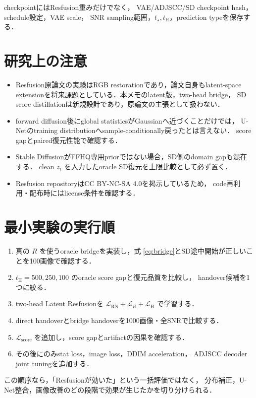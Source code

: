 \documentclass[11pt,a4paper]{ltjsarticle}
\begin{document}
checkpointにはResfusion重みだけでなく，
VAE/ADJSCC/SD checkpoint hash，schedule設定，VAE scale，
SNR sampling範囲，\(t_\star,t_{\mathrm H}\)，prediction typeを保存する．

\section{研究上の注意}

\begin{itemize}
  \item Resfusion原論文\cite{resfusion}の実験はRGB restorationであり，論文自身もlatent-space
        extensionを将来課題としている．本メモのlatent版，two-head bridge，
        SD score distillationは新規設計であり，原論文の主張として扱わない．
  \item forward diffusion後にglobal statisticsがGaussianへ近づくことだけでは，
        U-Netのtraining distributionへsample-conditionally戻ったとは言えない．
        score gapとpaired復元性能で確認する．
  \item Stable DiffusionがFFHQ専用priorではない場合，SD側のdomain gapも混在する．
        clean \(z_t\) を入力したoracle SD復元を上限比較として必ず置く．
  \item Resfusion repository\cite{resfusion-code}はCC BY-NC-SA 4.0を掲示しているため，
        code再利用・配布時にはlicense条件を確認する．
\end{itemize}

\section{最小実験の実行順}

\begin{enumerate}
  \item 真の \(R\) を使うoracle bridgeを実装し，式
        \eqref{eq:bridge}とSD途中開始が正しいことを100画像で確認する．
  \item \(t_{\mathrm H}=500,250,100\) のoracle score gapと復元品質を比較し，
        handover候補を1つに絞る．
  \item two-head Latent Resfusionを
        \(\mathcal L_{\mathrm{RN}}+\mathcal L_R+\mathcal L_{\mathrm H}\) で学習する．
  \item direct handoverとbridge handoverを1000画像・全SNRで比較する．
  \item \(\mathcal L_{\mathrm{score}}\) を追加し，score gapとartifactの因果を確認する．
  \item その後にのみstat loss，image loss，DDIM acceleration，
        ADJSCC decoder joint tuningを追加する．
\end{enumerate}
この順序なら，「Resfusionが効いた」という一括評価ではなく，
分布補正，U-Net整合，画像改善のどの段階で効果が生じたかを切り分けられる．
\end{document}
